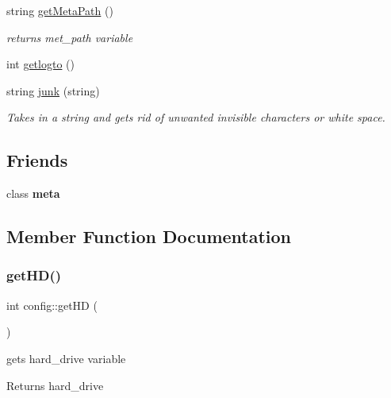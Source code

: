 \begin{DoxyCompactItemize}
string \mbox{\hyperlink{classconfig_aed522f2e93dd2216c25b1877940c74f6}{get\+Meta\+Path}} ()
\begin{DoxyCompactList}\small\item\em returns met\+\_\+path variable \end{DoxyCompactList}\item 
int \mbox{\hyperlink{classconfig_a9bb4603f5922557dc69904e10fdb2b8a}{getlogto}} ()
\item 
string \mbox{\hyperlink{classconfig_af3601cc6eb1a184fb1cf746a883b8bb5}{junk}} (string)
\begin{DoxyCompactList}\small\item\em Takes in a string and gets rid of unwanted invisible characters or white space. \end{DoxyCompactList}\end{DoxyCompactItemize}
\subsection*{Friends}
\begin{DoxyCompactItemize}
\item 
\mbox{\label{classconfig_ad2758c6e44f2ff44e25c1f5602f2dd2a}} 
class {\bfseries meta}
\end{DoxyCompactItemize}


\subsection{Member Function Documentation}
\mbox{\label{classconfig_adeeb1fbdbaf55ecd2a912fd1446d0021}} 
\subsubsection{\texorpdfstring{getHD()}{getHD()}}
{\footnotesize\ttfamily int config\+::get\+HD (\begin{DoxyParamCaption}{ }\end{DoxyParamCaption})}



gets hard\+\_\+drive variable 

\begin{DoxyReturn}{Returns}
hard\+\_\+drive 
\end{DoxyReturn}
\mbox{\label{classconfig_ae641db7341e7483714a27862e606e96d}} 
